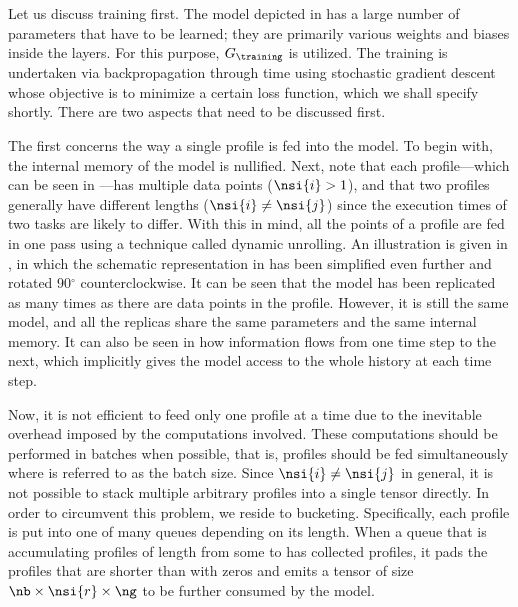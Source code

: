 Let us discuss training first. The model depicted in
 has a large number of parameters that have to be
learned; they are primarily various weights and biases inside the layers. For
this purpose, $G_\training$ is utilized. The training is undertaken via
backpropagation through time using stochastic gradient descent
\cite{goodfellow2016} whose objective is to minimize a certain loss function,
which we shall specify shortly. There are two aspects that need to be discussed
first.

The first concerns the way a single profile is fed into the model. To begin
with, the internal memory of the model is nullified. Next, note that each
profile---which can be seen in ---has multiple data points
($\nsi{i} > 1$), and that two profiles generally have different lengths
($\nsi{i} \neq \nsi{j}$) since the execution times of two tasks are likely to
differ. With this in mind, all the points of a profile are fed in one pass using
a technique called dynamic unrolling. An illustration is given in
, in which the schematic representation in
 has been simplified even further and rotated
90${}^\circ$ counterclockwise. It can be seen that the model has been replicated
as many times as there are data points in the profile. However, it is still the
same model, and all the replicas share the same parameters and the same internal
memory. It can also be seen in  how information flows
from one time step to the next, which implicitly gives the model access to the
whole history at each time step.

Now, it is not efficient to feed only one profile at a time due to the
inevitable overhead imposed by the computations involved. These computations
should be performed in batches when possible, that is, \nb profiles should be
fed simultaneously where \nb is referred to as the batch size. Since $\nsi{i}
\neq \nsi{j}$ in general, it is not possible to stack multiple arbitrary
profiles into a single tensor directly. In order to circumvent this problem, we
reside to bucketing. Specifically, each profile is put into one of many queues
depending on its length. When a queue that is accumulating profiles of length
from some  to  has collected \nb profiles, it pads the profiles
that are shorter than  with zeros and emits a tensor of size $\nb \times
\nsi{r} \times \ng$ to be further consumed by the model.

